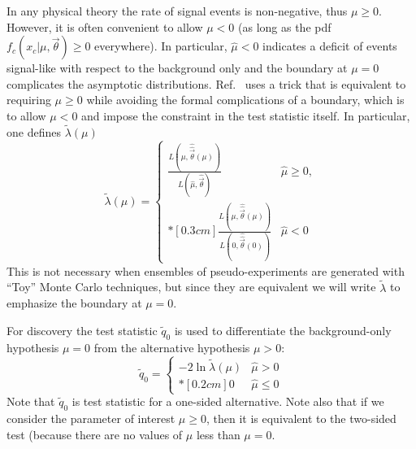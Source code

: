 In any physical theory the rate of signal events is non-negative, thus $\mu\ge 0$.  However, it is often convenient to allow $\mu<0$ (as long as the pdf $f_c(x_c | \mu,\vec\theta)\ge 0$ everywhere).  In particular, $\hat\mu<0$ indicates a deficit of events signal-like with respect to the background only and the boundary at $\mu=0$ complicates the asymptotic distributions.  Ref.~\cite{asimov} uses a  trick that is equivalent to requiring $\mu\ge 0$ while avoiding the formal complications of a boundary, which is to allow $\mu< 0$ and   impose the constraint in the test statistic itself.  In particular, one defines $\tilde \lambda(\mu)$
\begin{equation}
\label{eq:lambdatilde}  \tilde{\lambda}({\mu}) =  \left\{ 
\begin{array}{ll} \frac{ L(\mu, \hat{\hat{\vec{\theta}}}(\mu)) }
{L(\hat{\mu}, \hat{\vec{\theta}}) } & \hat{\mu} \ge 0 , \\*[0.3 cm]
\frac{ L(\mu, \hat{\hat{\vec{\theta}}}(\mu)) }  {L(0,
\hat{\hat{\vec{\theta}}}(0)) } & \hat{\mu} < 0 
              \end{array} \right.
\end{equation}
This is not necessary when ensembles of pseudo-experiments are generated with ``Toy'' Monte Carlo techniques, but since they are equivalent we will write $\tilde\lambda$ to emphasize the boundary at $\mu=0$.


For discovery the test statistic $\tilde{q}_0$  is used to differentiate the background-only hypothesis $\mu=0$ from the alternative hypothesis $\mu>0$:
\begin{equation}
\tilde{q}_{0} =  \left\{ \!
\! \begin{array}{ll} - 2 \ln \tilde{\lambda}(\mu)  & \hat{\mu} > 0
\\*[0.2 cm] 0 & \hat{\mu} \le 0 
              \end{array} \right.  
\end{equation}
Note that $\tilde{q}_0$ is test statistic for a one-sided alternative.  Note also that if we consider the parameter of interest $\mu\ge 0$, then it is equivalent to the two-sided test (because there are no values of $\mu$ less than $\mu=0$. 


